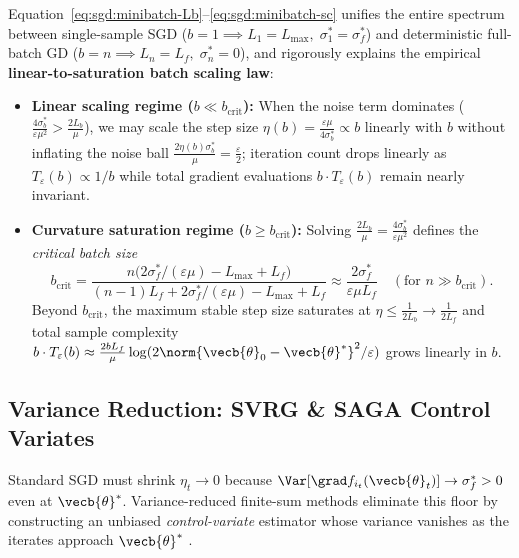 \documentclass[../../../../master.tex]{subfiles}
\begin{document}
Equation~\eqref{eq:sgd:minibatch-Lb}--\eqref{eq:sgd:minibatch-sc} unifies the entire spectrum between single-sample SGD ($b=1 \implies L_1 = L_{\max},\; \sigma_1^* = \sigma_f^*$) and deterministic full-batch GD ($b=n \implies L_n = L_f,\; \sigma_n^* = 0$), and rigorously explains the empirical \textbf{linear-to-saturation batch scaling law}:
\begin{itemize}
  \item \textbf{Linear scaling regime ($b \ll b_{\mathrm{crit}}$):} When the noise term dominates ($\frac{4\sigma_b^*}{\varepsilon\mu^2} > \frac{2L_b}{\mu}$), we may scale the step size $\eta(b) = \frac{\varepsilon\mu}{4\sigma_b^*} \propto b$ linearly with $b$ without inflating the noise ball $\frac{2\eta(b)\sigma_b^*}{\mu} = \frac{\varepsilon}{2}$; iteration count drops linearly as $T_\varepsilon(b) \propto 1/b$ while total gradient evaluations $b\cdot T_\varepsilon(b)$ remain nearly invariant.
  \item \textbf{Curvature saturation regime ($b \ge b_{\mathrm{crit}}$):} Solving $\frac{2L_b}{\mu} = \frac{4\sigma_b^*}{\varepsilon\mu^2}$ defines the \emph{critical batch size}
  \begin{equation}
  \label{eq:sgd:bcrit}
  b_{\mathrm{crit}} = \frac{n\bigl(2\sigma_f^*/(\varepsilon\mu) - L_{\max} + L_f\bigr)}{(n-1)L_f + 2\sigma_f^*/(\varepsilon\mu) - L_{\max} + L_f}
  \approx \frac{2\sigma_f^*}{\varepsilon \mu L_f} \quad (\text{for } n \gg b_{\mathrm{crit}}).
  \end{equation}
  Beyond $b_{\mathrm{crit}}$, the maximum stable step size saturates at $\eta \le \frac{1}{2L_b} \to \frac{1}{2L_f}$ and total sample complexity $b \cdot T_\varepsilon(b) \approx \frac{2 b L_f}{\mu}\log(2\norm{\vecb{\theta}_0 - \vecb{\theta}^*}^2/\varepsilon)$ grows linearly in $b$.
\end{itemize}

\subsection{Variance Reduction: SVRG \& SAGA Control Variates}
\label{sec:sgd:variance-reduction}

Standard SGD must shrink $\eta_t \to 0$ because $\Var[\grad f_{i_t}(\vecb{\theta}_t)] \to \sigma_f^* > 0$ even at $\vecb{\theta}^*$. Variance-reduced finite-sum methods eliminate this floor by constructing an unbiased \emph{control-variate} estimator whose variance vanishes as the iterates approach $\vecb{\theta}^*$ .
\end{document}
